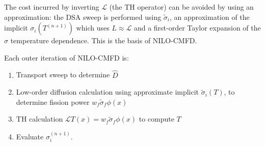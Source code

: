 \documentclass{notes-template}
\begin{document}
The cost incurred by inverting $\mathcal{L}$ (the TH operator) can be avoided by using an approximation: the DSA sweep is performed using $\tilde{\sigma}_i$, an approximation of the implicit $\sigma_i(T^{(n+1)})$ which uses $L \approx \mathcal{L}$ and a first-order Taylor expansion of the $\sigma$ temperature dependence. This is the basis of NILO-CMFD.

Each outer iteration of NILO-CMFD is:

\begin{enumerate}
    \item Transport sweep to determine $\hat{D}$
    \item Low-order diffusion calculation using approximate implicit $\tilde{\sigma}_i(T)$, to determine fission power $w_f\tilde{\sigma}_f\phi(x)$
    \item TH calculation $\mathcal{L}T(x) = w_f\tilde{\sigma}_f\phi(x)$ to compute $T$
    \item Evaluate $\sigma_i^{(n+1)}$.
\end{enumerate}








\end{document}
